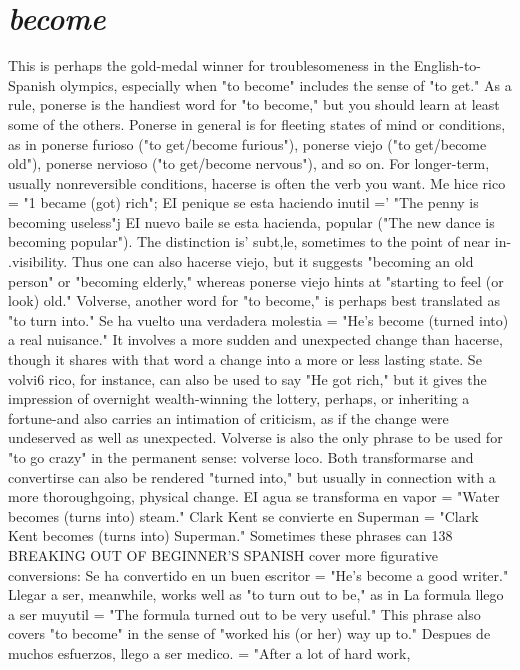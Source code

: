 \section{\emph{become}}

This is perhaps the gold-medal winner for troublesomeness
in the English-to-Spanish olympics, especially when "to become" includes the sense of "to get." As a rule, ponerse is the handiest word for
"to become," but you should learn at least some of the others. Ponerse
in general is for fleeting states of mind or conditions, as in ponerse furioso ("to get/become furious"), ponerse viejo ("to get/become old"),
ponerse nervioso ("to get/become nervous"), and so on.
For longer-term, usually nonreversible conditions, hacerse is
often the verb you want. Me hice rico = "1 became (got) rich"; EI penique se esta haciendo inutil =' "The penny is becoming useless"j EI
nuevo baile se esta hacienda, popular ("The new dance is becoming
popular"). The distinction is' subt,le, sometimes to the point of near in-
.visibility. Thus one can also hacerse viejo, but it suggests "becoming
an old person" or "becoming elderly," whereas ponerse viejo hints at
"starting to feel (or look) old."
Volverse, another word for "to become," is perhaps best translated as "to turn into." Se ha vuelto una verdadera molestia = "He's
become (turned into) a real nuisance." It involves a more sudden and
unexpected change than hacerse, though it shares with that word a
change into a more or less lasting state. Se volvi6 rico, for instance,
can also be used to say "He got rich," but it gives the impression of
overnight wealth-winning the lottery, perhaps, or inheriting a fortune-and also carries an intimation of criticism, as if the change were
undeserved as well as unexpected. Volverse is also the only phrase to
be used for "to go crazy" in the permanent sense: volverse loco.
Both transformarse and convertirse can also be rendered
"turned into," but usually in connection with a more thoroughgoing,
physical change. EI agua se transforma en vapor = "Water becomes
(turns into) steam." Clark Kent se convierte en Superman = "Clark
Kent becomes (turns into) Superman." Sometimes these phrases can
138 BREAKING OUT OF BEGINNER'S SPANISH
cover more figurative conversions: Se ha convertido en un buen escritor = "He's become a good writer." Llegar a ser, meanwhile, works
well as "to turn out to be," as in La formula llego a ser muyutil =
"The formula turned out to be very useful." This phrase also covers
"to become" in the sense of "worked his (or her) way up to." Despues
de muchos esfuerzos, llego a ser medico. = "After a lot of hard work,
